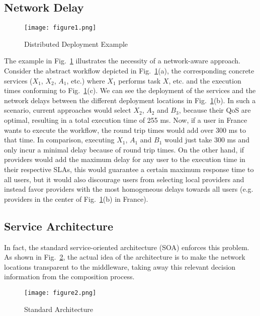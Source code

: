 \documentclass[10pt, conference, compsocconf]{IEEEtran}
\newcommand{\oneImage}{3.2in}
\newcommand{\twoImages}{1.6in}
\begin{document}
\subsection{Network Delay}
\begin{figure}[htb!]
	\centering
	\texttt{[image: figure1.png]}
	\caption{Distributed Deployment Example}
	\label{fig:example1}
\end{figure}

\noindent The example in Fig.~\ref{fig:example1} illustrates the necessity of a network-aware approach.
Consider the abstract workflow depicted in Fig.~\ref{fig:example1}(a),
	the corresponding concrete services ($X_1$, $X_2$, $A_1$, etc.) where $X_1$ performs task $X$, etc.
		and the execution times conforming to Fig.~\ref{fig:example1}(c).
We can see the deployment of the services and the network delays between the different deployment locations in Fig.~\ref{fig:example1}(b).
In such a scenario, current approaches would select $X_2$, $A_2$ and $B_3$,
	because their QoS are optimal, resulting in a total execution time of 255 ms.
Now, if a user in France wants to execute the workflow,
	the round trip times would add over 300 ms to that time.
In comparison, executing $X_1$, $A_1$ and $B_1$ would just take 300 ms
	and only incur a minimal delay because of round trip times.
On the other hand, if providers would add the maximum delay for any user to the execution time in their respective SLAs,
	this would guarantee a certain maximum response time to all users,
		but it would also discourage users from selecting local providers
			and instead favor providers with the most homogeneous delays towards all users
				(e.g. providers in the center of Fig.~\ref{fig:example1}(b) in France).

\subsection{Service Architecture}
\noindent In fact, the standard service-oriented architecture (SOA) enforces this problem.
As shown in Fig.~\ref{fig:architecture}, 
	the actual idea of the architecture is to make the network locations transparent to the middleware,
		taking away this relevant decision information from the composition process.

\begin{figure}[htb!]
	\centering
	\texttt{[image: figure2.png]}
	\caption{Standard Architecture}
	\label{fig:architecture}
\end{figure}
\end{document}
